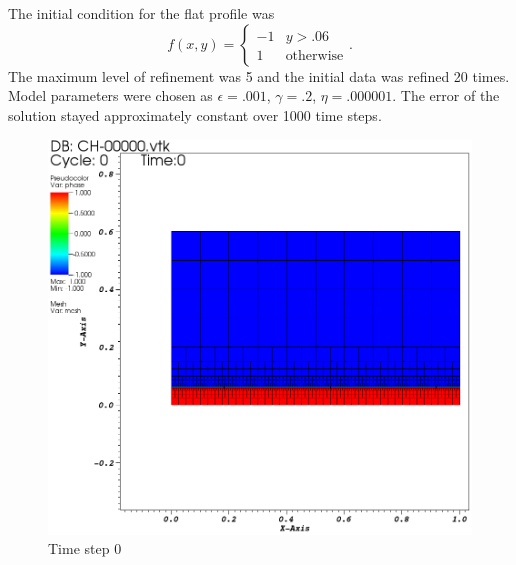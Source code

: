 \documentclass[9pt]{beamer}
\newcommand{\eps}{\epsilon}
\begin{document}
\begin{frame}
	The initial condition for the flat profile was
	$$
		f(x, y) = \begin{cases}
			-1 & y > .06\\
			1 & \text{otherwise}
		\end{cases}.
	$$
	The maximum level of refinement was 5 and the initial data was refined 20 times. Model parameters were chosen as $\eps = .001$, $\gamma = .2$, $\eta = .000001$. The error of the solution stayed approximately constant over 1000 time steps.
	\begin{minipage}{.4\paperwidth}
		\begin{figure}[!b]
			\centering
			\includegraphics[scale=.6]{CHFlat1.png}
			\caption*{Time step 0}
		\end{figure}
	\end{minipage}%
	\begin{minipage}{.4\paperwidth}
		\begin{figure}[!b]
			\centering

\end{figure}
\end{minipage}
\end{frame}
\end{document}
